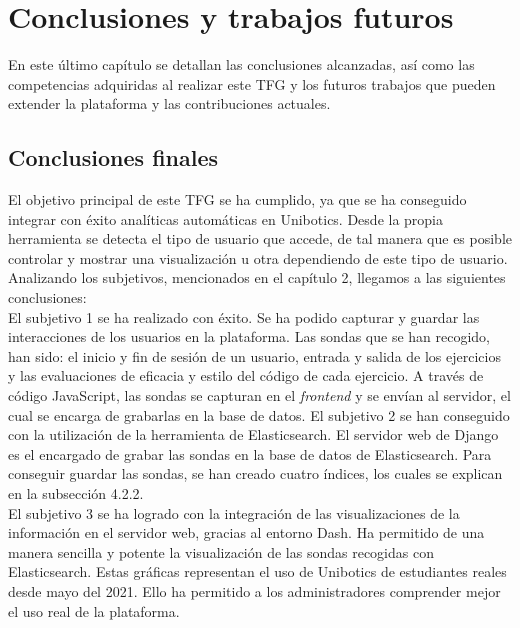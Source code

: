 \chapter{Conclusiones y trabajos futuros}\label{conclusión}

	En este último capítulo se detallan las conclusiones alcanzadas, así como las competencias adquiridas al realizar este TFG y los futuros trabajos que pueden extender la plataforma y las contribuciones actuales.
	
	\section{Conclusiones finales} 
	\label{sec:conclusiones_finales} 
El objetivo principal de este TFG se ha cumplido, ya que se ha conseguido integrar con éxito analíticas automáticas en Unibotics. Desde la propia herramienta se detecta el tipo de usuario que accede, de tal manera que es posible controlar y mostrar una visualización u otra dependiendo de este tipo de usuario. Analizando los subjetivos, mencionados en el capítulo 2, llegamos a las siguientes conclusiones:\\

 El subjetivo 1 se ha realizado con éxito. Se ha podido capturar y guardar las interacciones de los usuarios en la plataforma. Las sondas que se han recogido, han sido: el inicio y fin de sesión de un usuario, entrada y salida de los ejercicios y las evaluaciones de eficacia y estilo del código de cada ejercicio. A través de código JavaScript, las sondas se capturan en el \textit{frontend} y se envían al servidor, el cual se encarga de grabarlas en la base de datos.
\newpage
El subjetivo 2 se han conseguido con la utilización de la herramienta de Elasticsearch. El servidor web de Django es el encargado de grabar las sondas en la base de datos de Elasticsearch. Para conseguir guardar las sondas, se han creado cuatro índices, los cuales se explican en la subsección 4.2.2.\\

El subjetivo 3 se ha logrado con la integración de las visualizaciones de la información en el servidor web, gracias al entorno Dash. Ha permitido de una manera sencilla y potente la visualización de las sondas recogidas con Elasticsearch. Estas gráficas representan el uso de Unibotics de estudiantes reales desde mayo del 2021. Ello ha permitido a los administradores comprender mejor el uso real de la plataforma.\\


